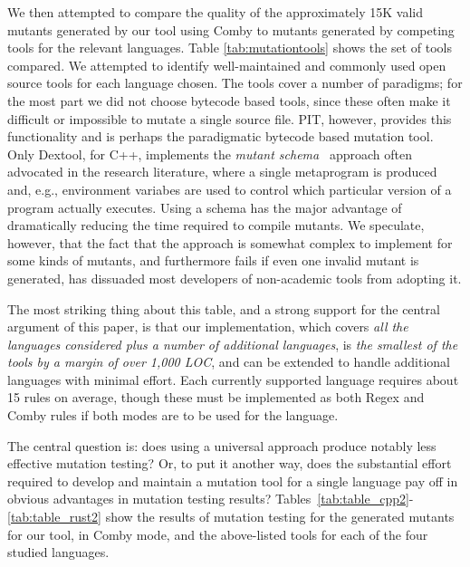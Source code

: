 \documentclass[acmsmall,screen,review,anonymous]{acmart}
\begin{document}
{ We then attempted to compare the quality of the approximately 15K
 valid mutants generated by our tool using Comby to mutants generated
 by competing tools for the relevant languages.
Table \ref{tab:mutationtools} shows the set of tools compared.  We
attempted to identify well-maintained and commonly used open
source tools for each
language chosen.  The tools cover a number of paradigms; for the most
part we did not choose bytecode based tools, since these often make it
difficult or impossible to mutate a single source file.  PIT, however,
provides this functionality and is perhaps the paradigmatic bytecode
based mutation tool.  Only Dextool, for C++, implements the
\emph{mutant schema}~\cite{untch1993mutation} approach often advocated
in the research literature, where a single metaprogram is produced
and, e.g., environment variabes are used to control which particular
version of a program actually executes.  Using a schema has the major
advantage of dramatically reducing the time required to compile
mutants.  We speculate, however, that the fact that the approach is
somewhat complex to implement for some kinds of mutants, and
furthermore fails if even one invalid mutant is generated, has
dissuaded most developers of non-academic tools from adopting it.

The most striking thing about this table, and a strong support for
the central argument of this paper, is that our implementation, which
covers \emph{all the languages considered plus a number of additional
languages}, is \emph{the smallest of the tools by a margin of over 1,000 LOC},
and can be extended to handle additional languages with minimal
effort.  Each currently supported language requires about 15 rules on
average, though these must be implemented as both Regex and Comby
rules if both modes are to be used for the language.

The central question is: does using a universal approach produce
notably less effective mutation testing?  Or, to put it another way,
does the substantial effort required to develop and maintain a
mutation tool for a single language pay off in obvious advantages in
mutation testing results?
Tables~\ref{tab:table_cpp2}-\ref{tab:table_rust2} show the results of
mutation testing for the generated mutants for our tool, in Comby mode, and the above-listed tools for each of the four
studied languages.  

}
\end{document}

